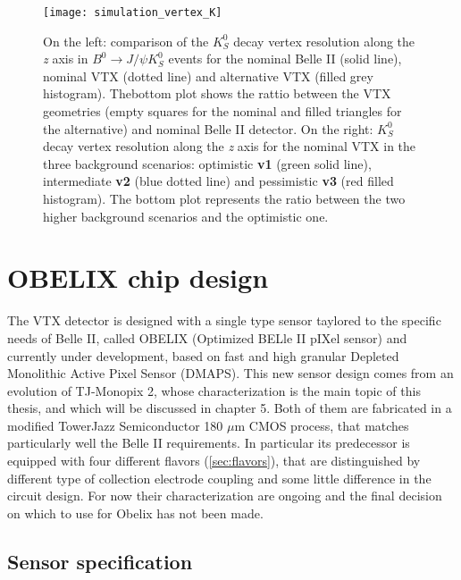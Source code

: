 \begin{figure}[h!]
\centering
\texttt{[image: simulation\_vertex\_K]}
\caption{On the left: comparison of the $K_{S}^{0}$ decay vertex resolution along the \textit{z} axis in $B^{0} \rightarrow J/\psi K_{S}^{0}$ events for the nominal Belle II (solid line), nominal VTX (dotted line) and alternative VTX (filled grey histogram). Thebottom plot shows the rattio between the VTX geometries (empty squares for the nominal and filled triangles for the alternative) and nominal Belle II detector. 
On the right: $K_{S}^{0}$ decay vertex resolution along the \textit{z} axis for the nominal VTX in the three background scenarios: optimistic \textbf{v1} (green solid line), intermediate \textbf{v2} (blue dotted line) and pessimistic \textbf{v3} (red filled histogram). The bottom plot represents the ratio between the two higher background scenarios and the optimistic one.}
\label{fig:simulation_vertex_K}
\end{figure}


\section{OBELIX chip design}

The VTX detector is designed with a single type sensor taylored to the specific needs of Belle II, called OBELIX (Optimized BELle II pIXel sensor) and currently under development, based on fast and high granular Depleted Monolithic Active Pixel Sensor (DMAPS). This new sensor design comes from an evolution of TJ-Monopix 2, whose characterization is the main topic of this thesis, and which will be discussed in chapter 5. Both of them are fabricated in a modified TowerJazz Semiconductor 180 $\mu$m CMOS process, that matches particularly well the Belle II requirements.
In particular its predecessor is equipped with four different flavors (\autoref{sec:flavors}), that are distinguished by different type of collection electrode coupling and some little difference in the circuit design. For now their characterization are ongoing and the final decision on which to use for Obelix has not been made. \\

\subsection{Sensor specification}

